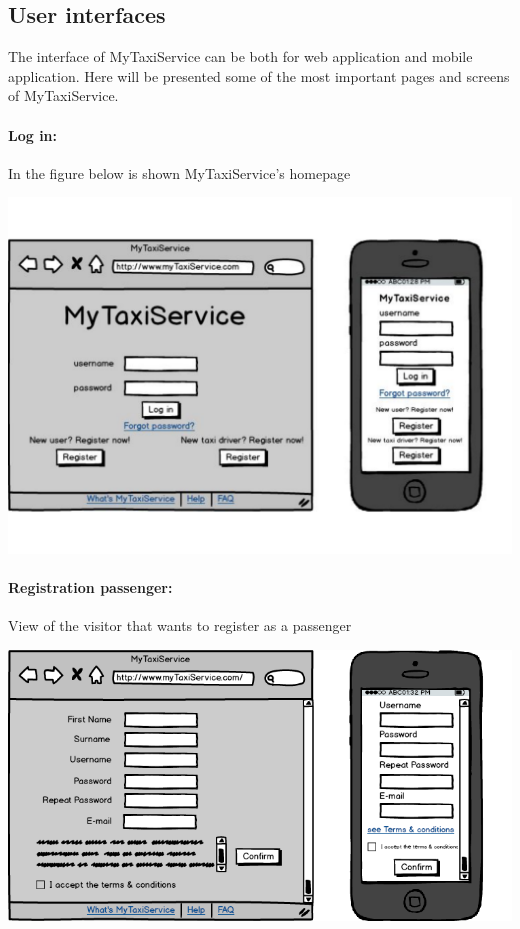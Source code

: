 \subsection{User interfaces}
The interface of MyTaxiService can be both for web application and mobile application. Here will be presented some of the most important pages and screens of MyTaxiService.

\paragraph{Log in:}
	In the figure below is shown MyTaxiService's homepage
	\begin{center}
		\includegraphics[width=\textwidth]{mockup/login1.pdf}
	\end{center}
	
\paragraph{Registration passenger:}
	View of the visitor that wants to register as a passenger
\begin{center}
	\includegraphics[width=\textwidth]{mockup/registrationPassenger.png}
\end{center}



